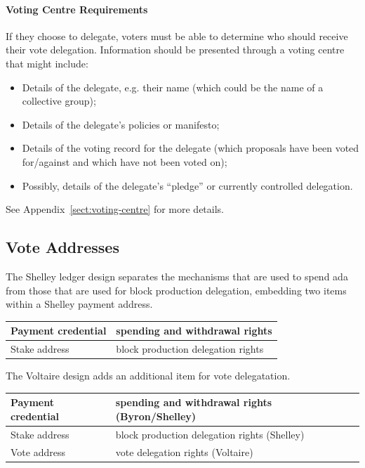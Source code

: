 \paragraph{Voting Centre Requirements}

If they choose to delegate, voters must be able to determine who should receive their vote delegation.  Information should be presented through a voting centre that might include:
\begin{itemize}
\item
Details of the delegate, e.g. their name (which could be the name of a collective group);
\item
Details of the delegate's policies or manifesto;
\item
Details of the voting record for the delegate (which proposals have been voted for/against and which have not been voted on);
\item
Possibly, details of the delegate's ``pledge'' or currently controlled delegation.
\end{itemize}
See Appendix~\ref{sect:voting-centre} for more details.

\subsection{Vote Addresses}

The Shelley ledger design separates the mechanisms that are used to spend ada from those that are used for block production delegation, embedding two items within a Shelley payment address.

\begin{center}
  \begin{tabular}{||l|l||}
  \hline\hline
  Payment credential & spending and withdrawal rights \\\hline
  Stake address & block production delegation rights \\\hline
  \hline
  \end{tabular}
\end{center}

The Voltaire design adds an additional item for vote delegatation.

\begin{center}
  \begin{tabular}{||l|l||}
  \hline\hline
  Payment credential & spending and withdrawal rights (Byron/Shelley) \\\hline
  Stake address & block production delegation rights (Shelley) \\\hline
  Vote address & vote delegation rights (Voltaire) \\\hline
  \hline
\end{tabular}
\end{center}

